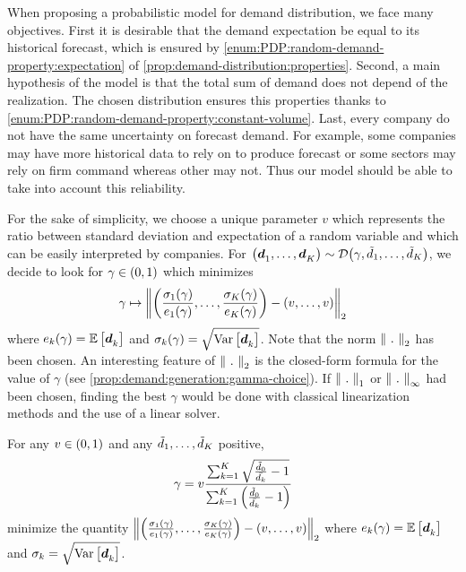 When proposing a probabilistic model for demand distribution, we face many objectives.
First it is desirable that the demand expectation be equal to its historical forecast, which is ensured by \cref{enum:PDP:random-demand-property:expectation} of \cref{prop:demand-distribution:properties}.
Second, a main hypothesis of the model is that the total sum of demand does not depend of the realization.
The chosen distribution ensures this properties thanks to \cref{enum:PDP:random-demand-property:constant-volume}.
Last, every company do not have the same uncertainty on forecast demand.
For example, some companies may have more historical data to rely on to produce forecast or some sectors may rely on firm command whereas other may not.
Thus our model should be able to take into account this reliability.


For the sake of simplicity, we choose a unique parameter $v$ which represents the ratio between standard deviation and expectation of a random variable and which can be easily interpreted by companies.
For $\bracket{\va\demand_1,\ldots,\va\demand_K}\sim\cD\bracket{\gamma,\tilde{\demand}_1,\ldots,\tilde{\demand}_K}$, we decide to look for $\gamma\in\bracket{0,1}$ which minimizes
\begin{equation}
  \gamma\mapsto\norm{\bracket{\frac{\sigma_1(\gamma)}{e_1(\gamma)},\ldots,\frac{\sigma_K(\gamma)}{e_K(\gamma)}}-\bracket{v,\ldots,v}}_2
\end{equation}
where $e_k(\gamma)=\espe\sqbracket{\va\demand_k}$ and $\sigma_k(\gamma)=\sqrt{\vari\sqbracket{\va\demand_k}}$.
Note that the norm $\norm{\ .\ }_2$ has been chosen.
An interesting feature of $\norm{\ .\ }_2$ is the closed-form formula for the value of $\gamma$ (see \cref{prop:demand:generation:gamma-choice}).
If $\norm{\ .\ }_1$ or $\norm{\ .\ }_{\infty}$ had been chosen, finding the best $\gamma$ would be done with classical linearization methods and the use of a linear solver.


\begin{prop}\label{prop:demand:generation:gamma-choice}
For any $v\in\bracket{0,1}$ and any $\tilde{d}_1,\ldots,\tilde{d}_K$ positive,
\begin{equation}
  \gamma
  =
  v\frac
  {\sum_{k=1}^K\sqrt{\frac{\tilde{\demand}_0}{\bar{\demand_k}}-1}}
  {\sum_{k=1}^K\bracket{\frac{\tilde{\demand}_0}{\bar{\demand_k}}-1}}
\end{equation}
minimize the quantity
$\norm{\bracket{\frac{\sigma_1(\gamma)}{e_1(\gamma)},\ldots,\frac{\sigma_K(\gamma)}{e_K(\gamma)}}-\bracket{v,\ldots,v}}_2$
where $e_k(\gamma)=\espe\sqbracket{\va\demand_k}$ and $\sigma_k=\sqrt{\vari\sqbracket{\va\demand_k}}$.
\end{prop}


